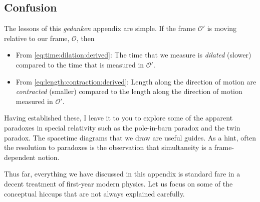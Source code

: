 \documentclass[12pt, oneside]{report}    %
\begin{document}
\begin{subappendices}
\subsection{Confusion}

The lessons of this \emph{gedanken} appendix are simple. If the frame $\mathcal O'$ is moving relative to our frame, $\mathcal O$, then
\begin{itemize}
    \item From \eqref{eq:time:dilation:derived}: The time that we measure is \emph{dilated} (slower) compared to the time that is measured in $\mathcal O'$. 
    \item From \eqref{eq:length:contraction:derived}: Length along the direction of motion are \emph{contracted} (smaller) compared to the length along the direction of motion measured in $\mathcal O'$. 
\end{itemize}
Having established these, I leave it to you to explore some of the apparent paradoxes in special relativity such as the pole-in-barn paradox and the twin paradox. The spacetime diagrams that we draw are useful guides. As a hint, often the resolution to paradoxes is the observation that simultaneity is a frame-dependent notion.

Thus far, everything we have discussed in this appendix is standard fare in a decent treatment of first-year modern physics. Let us focus on some of the conceptual hiccups that are not always explained carefully.


\end{subappendices}
\end{document}
